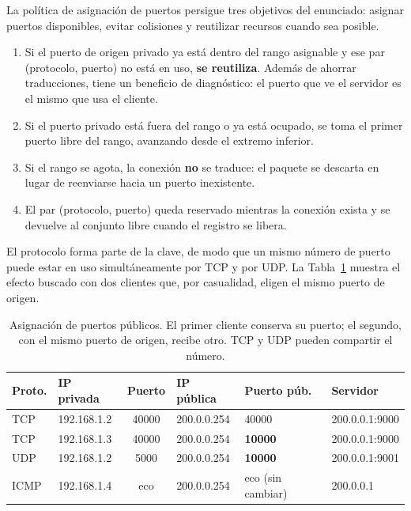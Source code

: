 ﻿\documentclass[10pt,a4paper]{article}
\begin{document}
La política de asignación de puertos persigue tres objetivos del enunciado: asignar
puertos disponibles, evitar colisiones y reutilizar recursos cuando sea posible.

\begin{enumerate}[nosep]
    \item Si el puerto de origen privado ya está dentro del rango asignable y ese
          par (protocolo, puerto) no está en uso, \textbf{se reutiliza}. Además de
          ahorrar traducciones, tiene un beneficio de diagnóstico: el puerto que ve
          el servidor es el mismo que usa el cliente.
    \item Si el puerto privado está fuera del rango o ya está ocupado, se toma el
          primer puerto libre del rango, avanzando desde el extremo inferior.
    \item Si el rango se agota, la conexión \textbf{no} se traduce: el paquete se
          descarta en lugar de reenviarse hacia un puerto inexistente.
    \item El par (protocolo, puerto) queda reservado mientras la conexión exista y
          se devuelve al conjunto libre cuando el registro se libera.
\end{enumerate}

El protocolo forma parte de la clave, de modo que un mismo número de puerto puede
estar en uso simultáneamente por TCP y por UDP. La Tabla~\ref{tab:ejemplo-puertos}
muestra el efecto buscado con dos clientes que, por casualidad, eligen el mismo
puerto de origen.

\begin{table}[H]
\centering
\begin{tabular}{llclll}
\toprule
\textbf{Proto.} & \textbf{IP privada} & \textbf{Puerto} & \textbf{IP pública} & \textbf{Puerto púb.} & \textbf{Servidor} \\
\midrule
TCP  & 192.168.1.2 & 40000 & 200.0.0.254 & 40000 & 200.0.0.1:9000 \\
TCP  & 192.168.1.3 & 40000 & 200.0.0.254 & \textbf{10000} & 200.0.0.1:9000 \\
UDP  & 192.168.1.2 & 5000  & 200.0.0.254 & \textbf{10000} & 200.0.0.1:9001 \\
ICMP & 192.168.1.4 & eco   & 200.0.0.254 & eco (sin cambiar) & 200.0.0.1 \\
\bottomrule
\end{tabular}
\caption{Asignación de puertos públicos. El primer cliente conserva su puerto; el
segundo, con el mismo puerto de origen, recibe otro. TCP y UDP pueden compartir el
número.}
\label{tab:ejemplo-puertos}
\end{table}
\end{document}
